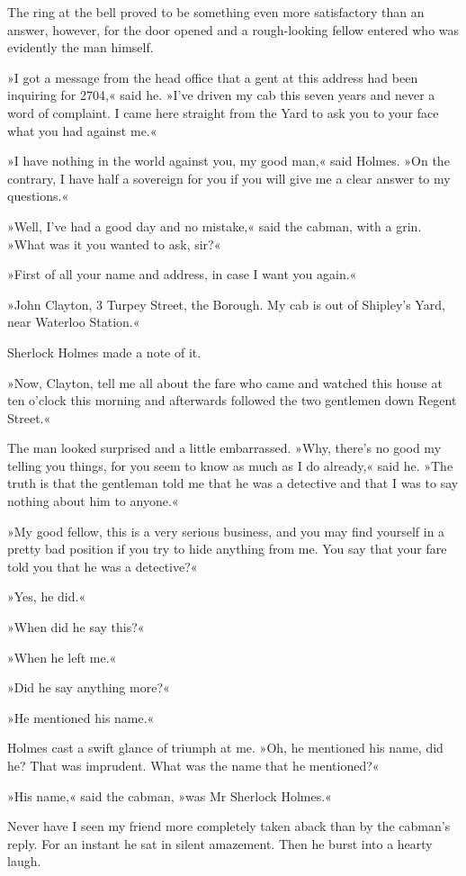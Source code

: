 The ring at the bell proved to be something even more satisfactory than an answer, however, for the door opened and a rough-looking fellow entered who was evidently the man himself.

»I got a message from the head office that a gent at this address had been inquiring for 2704,« said he. »I've driven my cab this seven years and never a word of complaint. I came here straight from the Yard to ask you to your face what you had against me.«

»I have nothing in the world against you, my good man,« said Holmes. »On the contrary, I have half a sovereign for you if you will give me a clear answer to my questions.«

»Well, I've had a good day and no mistake,« said the cabman, with a grin. »What was it you wanted to ask, sir?«

»First of all your name and address, in case I want you again.«

»John Clayton, 3 Turpey Street, the Borough. My cab is out of Shipley's Yard, near Waterloo Station.«

Sherlock Holmes made a note of it.

»Now, Clayton, tell me all about the fare who came and watched this house at ten o'clock this morning and afterwards followed the two gentlemen down Regent Street.«

The man looked surprised and a little embarrassed. »Why, there's no good my telling you things, for you seem to know as much as I do already,« said he. »The truth is that the gentleman told me that he was a detective and that I was to say nothing about him to anyone.«

»My good fellow, this is a very serious business, and you may find yourself in a pretty bad position if you try to hide anything from me. You say that your fare told you that he was a detective?«

»Yes, he did.«

»When did he say this?«

»When he left me.«

»Did he say anything more?«

»He mentioned his name.«


Holmes cast a swift glance of triumph at me. »Oh, he mentioned his name, did he? That was imprudent. What was the name that he mentioned?«

»His name,« said the cabman, »was Mr Sherlock Holmes.«

Never have I seen my friend more completely taken aback than by the cabman's reply. For an instant he sat in silent amazement. Then he burst into a hearty laugh.

